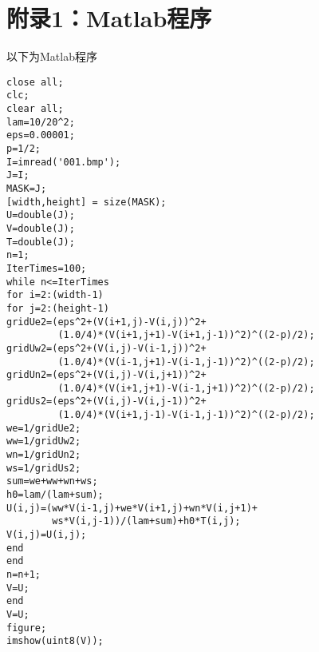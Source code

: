 \section{附录1：Matlab程序}
以下为Matlab程序
\begin{lstlisting}[frame=trBL]
close all;
clc;
clear all;
lam=10/20^2;
eps=0.00001;
p=1/2;
I=imread('001.bmp');
J=I;
MASK=J;
[width,height] = size(MASK);
U=double(J);
V=double(J);
T=double(J);
n=1;
IterTimes=100;
while n<=IterTimes
for i=2:(width-1)
for j=2:(height-1)
gridUe2=(eps^2+(V(i+1,j)-V(i,j))^2+
         (1.0/4)*(V(i+1,j+1)-V(i+1,j-1))^2)^((2-p)/2);
gridUw2=(eps^2+(V(i,j)-V(i-1,j))^2+
         (1.0/4)*(V(i-1,j+1)-V(i-1,j-1))^2)^((2-p)/2);
gridUn2=(eps^2+(V(i,j)-V(i,j+1))^2+
         (1.0/4)*(V(i+1,j+1)-V(i-1,j+1))^2)^((2-p)/2);
gridUs2=(eps^2+(V(i,j)-V(i,j-1))^2+
         (1.0/4)*(V(i+1,j-1)-V(i-1,j-1))^2)^((2-p)/2);
we=1/gridUe2;
ww=1/gridUw2;
wn=1/gridUn2;
ws=1/gridUs2;
sum=we+ww+wn+ws;
h0=lam/(lam+sum);
U(i,j)=(ww*V(i-1,j)+we*V(i+1,j)+wn*V(i,j+1)+
        ws*V(i,j-1))/(lam+sum)+h0*T(i,j);
V(i,j)=U(i,j);
end
end
n=n+1;
V=U;
end
V=U;
figure;
imshow(uint8(V));
\end{lstlisting}